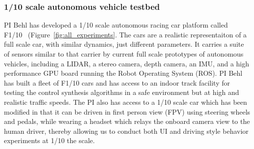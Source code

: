 \subsubsection{1/10 scale autonomous vehicle testbed}

PI Behl has developed a 1/10 scale autonomous racing car platform called F1/10~ (Figure~\ref{fig:all_experiments}. The cars are a realistic representaiton of a full scale car, with similar dynamics, just different parameters. It carries a suite of sensors similar to that carrier by current full scale prototypes of autonomous vehicles, including a LIDAR, a stereo camera, depth camera, an IMU, and a high performance GPU board running the Robot Operating System (ROS).
PI Behl has built a fleet of F1/10 cars and has access to an indoor track facility for testing the control synthesis algorithms in a safe environment but at high and realistic traffic speeds. The PI also has access to a 1/10 scale car which has been modified in that it can be driven in first person view (FPV) using steering wheels and pedals, while wearing a headset which relays the onboard camera view to the human driver, thereby allowing us to conduct both UI and driving style behavior experiments at 1/10 the scale.



